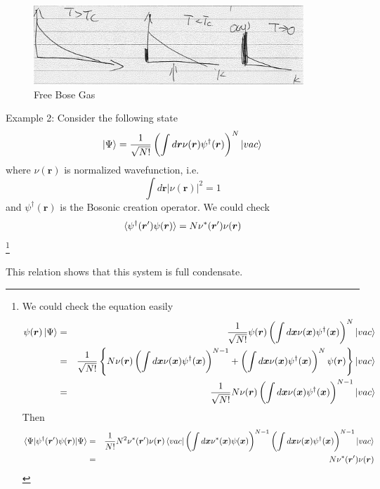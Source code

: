 \begin{figure}[htbp]
\centering
\includegraphics[width=4in]{image/ch1/1-5-free_bose.pdf} 
\caption{Free Bose Gas}
\label{fig:1-5}
\end{figure}

Example 2: Consider the following state
\begin{equation}
\ket{\Psi} = \frac{1}{\sqrt{N!}}\left(\int d\bm r \nu(\bm r) \psi^\dag(\bm r)\right)^N\ket{vac}
\end{equation}
where $\nu(\bm r)$ is normalized wavefunction, i.e.
\begin{equation}
\int d\bm r |\nu(\bm r)|^2 = 1
\end{equation}
and $\psi^\dag(\bm r)$ is the Bosonic creation operator.
We could check
\begin{equation}
\braket{\psi^\dag(\bm r') \psi(\bm r)} = N \nu^*(\bm r')\nu(\bm r)
\end{equation}
\footnote{We could check the equation easily
\begin{eqnarray}
\psi(\bm r) \ket{\Psi} &=& \frac{1}{\sqrt{N!}} \psi(\bm r)\left(\int d\bm x \nu(\bm x) \psi^\dag(\bm x)\right)^N\ket{vac}\notag\\
&=& \frac{1}{\sqrt{N!}} \left\{N \nu(\bm r) \left(\int d\bm x \nu(\bm x) \psi^\dag(\bm x)\right)^{N-1}+\left(\int d\bm x \nu(\bm x) \psi^\dag(\bm x)\right)^N\psi(\bm r)\right\} \ket{vac}\notag\\
&=&\frac{1}{\sqrt{N!}}N \nu(\bm r) \left(\int d\bm x \nu(\bm x) \psi^\dag(\bm x)\right)^{N-1} \ket{vac}\notag
\end{eqnarray}
Then
\begin{eqnarray}
\braket{\Psi|\psi^\dag(\bm r') \psi(\bm r)|\Psi} &=& \frac{1}{N!} N^2 \nu^*(\bm r')\nu(\bm r)\braket{vac|\left(\int d\bm x \nu^*(\bm x) \psi(\bm x)\right)^{N-1} \left(\int d\bm x \nu(\bm x) \psi^\dag(\bm x)\right)^{N-1} |vac}\notag\\
&=& N \nu^*(\bm r')\nu(\bm r)\notag
\end{eqnarray}
}

This relation shows that this system is full condensate. 

